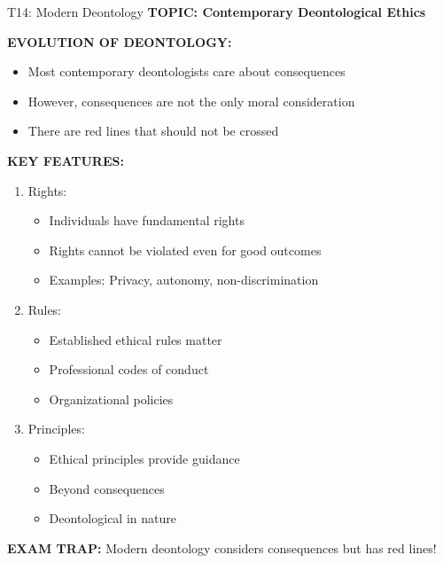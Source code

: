 \documentclass[8pt]{beamer}
\begin{document}
	\begin{frame}{T14: Modern Deontology}
		\fontsize{6.5}{7.5}\selectfont
		\textbf{TOPIC: Contemporary Deontological Ethics}
		
		\vspace{0.1cm}
		\textbf{EVOLUTION OF DEONTOLOGY:}
		\begin{itemize}
			\item Most contemporary deontologists care about consequences
			\item However, consequences are not the only moral consideration
			\item There are red lines that should not be crossed
		\end{itemize}
		
		\vspace{0.1cm}
		\textbf{KEY FEATURES:}
		\begin{enumerate}
			\item \textcolor{myblue}{Rights:}
			\begin{itemize}
				\item Individuals have fundamental rights
				\item Rights cannot be violated even for good outcomes
				\item Examples: Privacy, autonomy, non-discrimination
			\end{itemize}
			\item \textcolor{myblue}{Rules:}
			\begin{itemize}
				\item Established ethical rules matter
				\item Professional codes of conduct
				\item Organizational policies
			\end{itemize}
			\item \textcolor{myblue}{Principles:}
			\begin{itemize}
				\item Ethical principles provide guidance
				\item Beyond consequences
				\item Deontological in nature
			\end{itemize}
		\end{enumerate}
		
		\textcolor{myred}{\textbf{EXAM TRAP:}} Modern deontology \textcolor{myblue}{considers consequences but has red lines}!
	\end{frame}
	
\end{document}
